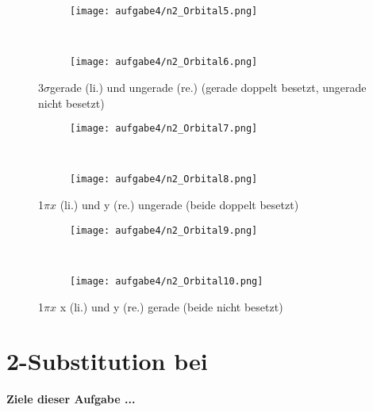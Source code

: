 \documentclass[12pt]{article}
\begin{document}
\begin{figure}[!hptb]
    \centering
    \begin{subfigure}[b]{0.4\textwidth}
        \texttt{[image: aufgabe4/n2\_Orbital5.png]}
    \end{subfigure}
    ~ %
    \begin{subfigure}[b]{0.4\textwidth}
        \texttt{[image: aufgabe4/n2\_Orbital6.png]}
    \end{subfigure}
    \caption{3$\sigma$gerade (li.) und ungerade (re.) (gerade doppelt besetzt, ungerade nicht besetzt)}
\end{figure}
\newpage
\begin{figure}[!hptb]
    \centering
    \begin{subfigure}[b]{0.4\textwidth}
        \texttt{[image: aufgabe4/n2\_Orbital7.png]}
    \end{subfigure}
    ~ %
    \begin{subfigure}[b]{0.4\textwidth}
        \texttt{[image: aufgabe4/n2\_Orbital8.png]}
    \end{subfigure}
    \caption{1$\pi x$  (li.) und y (re.) ungerade (beide doppelt besetzt)}
\end{figure}

\begin{figure}[!hptb]
    \centering
    \begin{subfigure}[b]{0.4\textwidth}
        \texttt{[image: aufgabe4/n2\_Orbital9.png]}
    \end{subfigure}
    ~ %
    \begin{subfigure}[b]{0.4\textwidth}
        \texttt{[image: aufgabe4/n2\_Orbital10.png]}
    \end{subfigure}
    \caption{1$\pi x$ x (li.) und y (re.) gerade (beide nicht besetzt)}
\end{figure}
\newpage
\section{2-Substitution bei }
\textbf{Ziele dieser Aufgabe ...}
\end{document}
